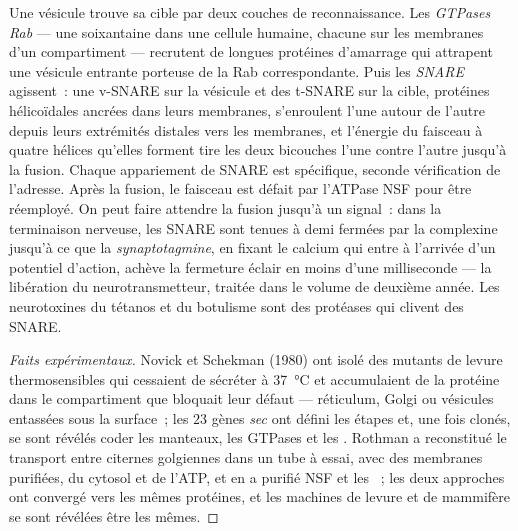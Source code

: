 \begin{definition}\label{def:b3:membrane-traffic:fusion}
Une vésicule trouve sa cible par deux couches de reconnaissance. Les
\emph{GTPases Rab} --- une soixantaine dans une cellule humaine,
chacune sur les membranes d'un compartiment --- recrutent de longues
protéines d'amarrage qui attrapent une vésicule entrante porteuse de la
Rab correspondante. Puis les \emph{SNARE} agissent~: une v-SNARE sur la
vésicule et des t-SNARE sur la cible, protéines hélicoïdales ancrées
dans leurs membranes, s'enroulent l'une autour de l'autre depuis leurs
extrémités distales vers les membranes, et l'énergie du faisceau à
quatre hélices qu'elles forment tire les deux bicouches l'une contre
l'autre jusqu'à la fusion. Chaque appariement de SNARE est spécifique,
seconde vérification de l'adresse. Après la fusion, le faisceau est
défait par l'ATPase NSF pour être réemployé. On peut faire attendre la
fusion jusqu'à un signal~: dans la terminaison nerveuse, les SNARE sont
tenues à demi fermées par la complexine jusqu'à ce que la
\emph{synaptotagmine}, en fixant le calcium qui entre à l'arrivée d'un
potentiel d'action, achève la fermeture éclair en moins d'une
milliseconde --- la libération du neurotransmetteur, traitée dans le
volume de deuxième année. Les neurotoxines du tétanos et du botulisme
sont des protéases qui clivent des SNARE.
\end{definition}

\begin{proof}[Faits expérimentaux]
Novick et Schekman (1980) ont isolé des mutants de levure thermosensibles
qui cessaient de sécréter à \qty{37}{\celsius} et accumulaient de la
protéine dans le compartiment que bloquait leur défaut --- réticulum,
Golgi ou vésicules entassées sous la surface~; les $23$ gènes
\emph{sec} ont défini les étapes et, une fois clonés, se sont révélés
coder les manteaux, les GTPases et les . Rothman a reconstitué le
transport entre citernes golgiennes dans un tube à essai, avec des
membranes purifiées, du cytosol et de l'ATP, et en a purifié NSF et les
~; les deux approches ont convergé vers les mêmes protéines, et les
machines de levure et de mammifère se sont révélées être les mêmes.
\end{proof}

